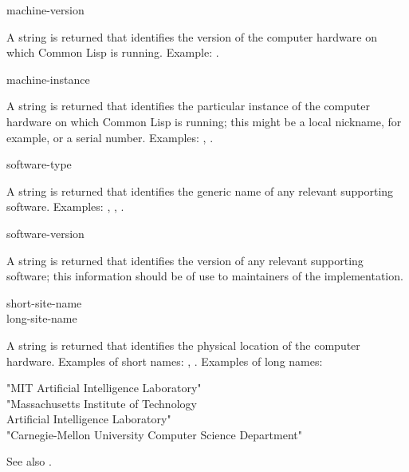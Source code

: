 \begin{defun}[Function]
machine-version 

A string is returned that identifies the version of
the computer hardware on which Common Lisp is running.
Example: .
\end{defun}

\begin{defun}[Function]
machine-instance 

A string is returned that identifies the particular
instance of the computer hardware on which Common Lisp is running;
this might be a local nickname, for example, or a serial number.
Examples: , .
\end{defun}

\begin{defun}[Function]
software-type 

A string is returned that identifies the generic name of
any relevant supporting software.
Examples: , , .
\end{defun}

\begin{defun}[Function]
software-version 

A string is returned that identifies the version of
any relevant supporting software; this information
should be of use to maintainers of the implementation.
\end{defun}

\begin{defun}[Function]
short-site-name  \\
long-site-name 

A string is returned that identifies the physical location
of the computer hardware.
Examples of short names: , .
Examples of long names:
\begin{lisp}
"MIT Artificial Intelligence Laboratory" \\
"Massachusetts Institute of Technology \\
Artificial Intelligence Laboratory" \\
"Carnegie-Mellon University Computer Science Department"
\end{lisp}
\end{defun}

\noindent
See also .


